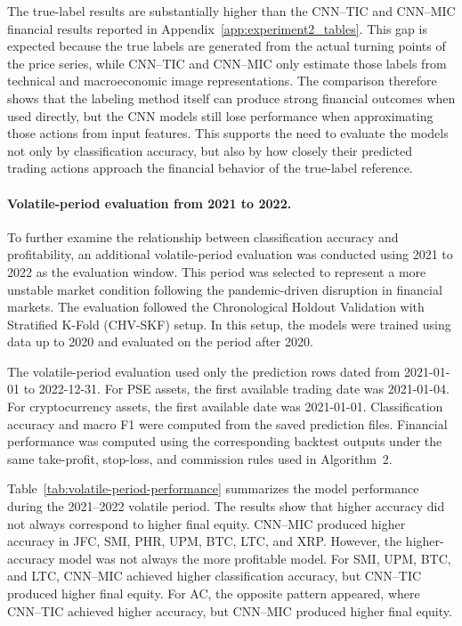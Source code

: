 The true-label results are substantially higher than the CNN--TIC and CNN--MIC financial results reported in Appendix~\ref{app:experiment2_tables}. This gap is expected because the true labels are generated from the actual turning points of the price series, while CNN--TIC and CNN--MIC only estimate those labels from technical and macroeconomic image representations. The comparison therefore shows that the labeling method itself can produce strong financial outcomes when used directly, but the CNN models still lose performance when approximating those actions from input features. This supports the need to evaluate the models not only by classification accuracy, but also by how closely their predicted trading actions approach the financial behavior of the true-label reference.

\paragraph{Volatile-period evaluation from 2021 to 2022.}

To further examine the relationship between classification accuracy and profitability, an additional volatile-period evaluation was conducted using 2021 to 2022 as the evaluation window. This period was selected to represent a more unstable market condition following the pandemic-driven disruption in financial markets. The evaluation followed the Chronological Holdout Validation with Stratified K-Fold (CHV-SKF) setup. In this setup, the models were trained using data up to 2020 and evaluated on the period after 2020. 

The volatile-period evaluation used only the prediction rows dated from 2021-01-01 to 2022-12-31. For PSE assets, the first available trading date was 2021-01-04. For cryptocurrency assets, the first available date was 2021-01-01. Classification accuracy and macro F1 were computed from the saved prediction files. Financial performance was computed using the corresponding backtest outputs under the same take-profit, stop-loss, and commission rules used in Algorithm~2.

Table~\ref{tab:volatile-period-performance} summarizes the model performance during the 2021--2022 volatile period. The results show that higher accuracy did not always correspond to higher final equity. CNN--MIC produced higher accuracy in JFC, SMI, PHR, UPM, BTC, LTC, and XRP. However, the higher-accuracy model was not always the more profitable model. For SMI, UPM, BTC, and LTC, CNN--MIC achieved higher classification accuracy, but CNN--TIC produced higher final equity. For AC, the opposite pattern appeared, where CNN--TIC achieved higher accuracy, but CNN--MIC produced higher final equity.

